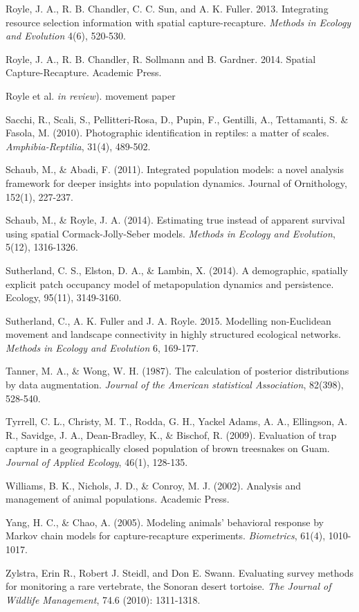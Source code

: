 \documentclass{book}
\begin{document}
\rf Royle, J. A., R. B. Chandler, C. C. Sun, and A. K. Fuller. 2013. Integrating resource selection information with spatial capture-recapture. {\it Methods in Ecology and Evolution} 4(6), 520-530.

\rf Royle, J. A., R. B. Chandler, R. Sollmann and B. Gardner. 2014. Spatial Capture-Recapture. Academic Press.

\rf Royle et al. {\it in review}).  movement paper

\rf Sacchi, R., Scali, S., Pellitteri-Rosa, D., Pupin, F., Gentilli, A., Tettamanti, S. \& Fasola, M. (2010). Photographic identification in reptiles: a matter of scales. \textit{Amphibia-Reptilia}, 31(4), 489-502.

\rf Schaub, M., \& Abadi, F. (2011). Integrated population models: a novel analysis framework for deeper insights into population dynamics. Journal of Ornithology, 152(1), 227-237.

\rf Schaub, M., \& Royle, J. A. (2014). Estimating true instead of apparent survival using spatial Cormack-Jolly-Seber models. \textit{Methods in Ecology and Evolution}, 5(12), 1316-1326.

\rf Sutherland, C. S., Elston, D. A., \& Lambin, X. (2014). A demographic, spatially explicit patch occupancy model of metapopulation dynamics and persistence. Ecology, 95(11), 3149-3160.

\rf Sutherland, C., A. K. Fuller and J. A. Royle. 2015. Modelling non-Euclidean movement and landscape connectivity in highly structured ecological networks. {\it Methods in Ecology and Evolution}  6, 169-177.

\rf Tanner, M. A., \& Wong, W. H. (1987). The calculation of posterior distributions by data augmentation. \textit{Journal of the American statistical Association}, 82(398), 528-540.

\rf Tyrrell, C. L., Christy, M. T., Rodda, G. H., Yackel Adams, A. A., Ellingson, A. R., Savidge, J. A., Dean-Bradley, K., \& Bischof, R. (2009). Evaluation of trap capture in a geographically closed population of brown treesnakes on Guam. \textit{Journal of Applied Ecology}, 46(1), 128-135.

\rf Williams, B. K., Nichols, J. D., \& Conroy, M. J. (2002). Analysis and management of animal populations. Academic Press.

\rf Yang, H. C., \& Chao, A. (2005). Modeling animals' behavioral response by Markov chain models for capture-recapture experiments. \textit{Biometrics}, 61(4), 1010-1017.

\rf Zylstra, Erin R., Robert J. Steidl, and Don E. Swann. Evaluating survey methods for monitoring a rare vertebrate, the Sonoran desert tortoise. \textit{The Journal of Wildlife Management}, 74.6 (2010): 1311-1318.
\end{document}
